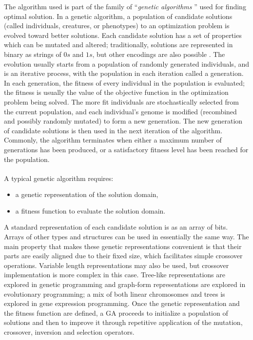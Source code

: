 \noindent The algorithm used is part of the family of ``\emph{genetic algorithms} \cite{wiki:xxx}'' used for finding optimal solution.
In a genetic algorithm, a population of candidate solutions (called individuals, creatures, or phenotypes) to an optimization problem is evolved toward better solutions. Each candidate solution has a set of properties which can be mutated and altered; traditionally, solutions are represented in binary as strings of $0s$ and $1s$, but other encodings are also possible \cite{Whitley1994}.
The evolution usually starts from a population of randomly generated individuals, and is an iterative process, with the population in each iteration called a generation. In each generation, the fitness of every individual in the population is evaluated; the fitness is usually the value of the objective function in the optimization problem being solved. The more fit individuals are stochastically selected from the current population, and each individual's genome is modified (recombined and possibly randomly mutated) to form a new generation. The new generation of candidate solutions is then used in the next iteration of the algorithm. Commonly, the algorithm terminates when either a maximum number of generations has been produced, or a satisfactory fitness level has been reached for the population.\linebreak
\\\\A typical genetic algorithm requires:
\begin{itemize}
\item a genetic representation of the solution domain,
\item a fitness function to evaluate the solution domain.
\end{itemize}
A standard representation of each candidate solution is as an array of bits\cite{Whitley1994}. Arrays of other types and structures can be used in essentially the same way. The main property that makes these genetic representations convenient is that their parts are easily aligned due to their fixed size, which facilitates simple crossover operations. Variable length representations may also be used, but crossover implementation is more complex in this case. Tree-like representations are explored in genetic programming and graph-form representations are explored in evolutionary programming; a mix of both linear chromosomes and trees is explored in gene expression programming.
Once the genetic representation and the fitness function are defined, a GA proceeds to initialize a population of solutions and then to improve it through repetitive application of the mutation, crossover, inversion and selection operators.
